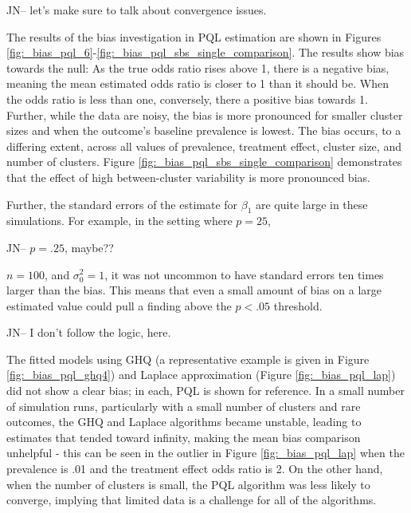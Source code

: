 \documentclass{article}
\begin{document}
\begin{flushleft}
JN-- let's make sure to talk about convergence issues.


The results of the bias investigation in PQL estimation are shown in Figures \ref{fig:_bias_pql_6}-\ref{fig:_bias_pql_sbs_single_comparison}. The results show bias towards the null: As the true odds ratio rises above 1, there is a negative bias, meaning the mean estimated odds ratio is closer to 1 than it should be. When the odds ratio is less than one, conversely, there a positive bias towards 1. Further, while the data are noisy, the bias is more pronounced for smaller cluster sizes and when the outcome's baseline prevalence is lowest. The bias occurs, to a differing extent, across all values of prevalence, treatment effect, cluster size, and number of clusters. Figure \ref{fig:_bias_pql_sbs_single_comparison} demonstrates that the effect of high between-cluster variability is more pronounced bias.

Further, the standard errors of the estimate for $\beta_1$ are quite large in these simulations. For example, in the setting where $p=25$,

JN-- $p = .25$, maybe??

$n=100$, and $\sigma_0^2=1$, it was not uncommon to have standard errors ten times larger than the bias. This means that even a small amount of bias on a large estimated value could pull a finding above the $p<.05$ threshold.

JN-- I don't follow the logic, here.

The fitted models using GHQ (a representative example is given in Figure \ref{fig:_bias_pql_ghq4}) and Laplace approximation (Figure \ref{fig:_bias_pql_lap}) did not show a clear bias; in each, PQL is shown for reference. In a small number of simulation runs, particularly with a small number of clusters and rare outcomes, the GHQ and Laplace algorithms became unstable, leading to estimates that tended toward infinity, making the mean bias comparison unhelpful - this can be seen in the outlier in Figure \ref{fig:_bias_pql_lap} when the prevalence is .01 and the treatment effect odds ratio is 2. On the other hand, when the number of clusters is small, the PQL algorithm was less likely to converge, implying that limited data is a challenge for all of the algorithms.


\end{flushleft}
\end{document}
